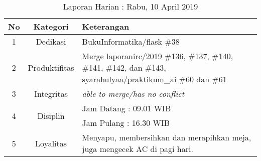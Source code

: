 \begin{table}[htp]
\begin{center}
\caption{Laporan Harian : Rabu, 10 April 2019}
\label{tab:lh100419}
\begin{tabularx}{\textwidth}{|l|l|X|}
\hline
\multicolumn{1}{|c|}{\textbf{No}} & \multicolumn{1}{c|}{\textbf{Kategori}} & \textbf{Keterangan} \\ \hline
\multicolumn{1}{|c|}{\multirow{1}{*}{1}} & \multicolumn{1}{c|}{\multirow{1}{*}{\parbox{2.5cm}{Dedikasi}}}
& BukuInformatika/flask \#38\\
\hline
\multicolumn{1}{|c|}{\multirow{1}{*}{2}} & \multicolumn{1}{c|}{\multirow{1}{*}{\parbox{2.5cm}{Produktifitas}}}
& Merge laporanirc/2019 \#136, \#137, \#140, \#141, \#142, dan \#143, syarahulyaa/praktikum\_ai \#60 dan \#61\\
\hline
\multicolumn{1}{|c|}{\multirow{1}{*}{3}} & \multicolumn{1}{c|}{\multirow{1}{*}{\parbox{2.5cm}{Integritas}}}
& \textit{able to merge/has no conflict} \\
\hline
\multicolumn{1}{|c|}{\multirow{2}{*}{4}} & \multicolumn{1}{c|}{\multirow{2}{*}{\parbox{2.5cm}{Disiplin}}}
& Jam Datang : 09.01 WIB \\
\multicolumn{1}{|c|}{\multirow{1}{*}{}} & \multicolumn{1}{c|}{\multirow{1}{*}{\parbox{2.5cm}{}}}
& Jam Pulang : 16.30 WIB \\
\hline
\multicolumn{1}{|c|}{\multirow{2}{*}{5}} & \multicolumn{1}{c|}{\multirow{2}{*}{\parbox{2.5cm}{Loyalitas}}}
& Menyapu, membersihkan dan merapihkan meja, juga mengecek AC di pagi hari.\\
\hline
\end{tabularx}
\end{center}
\end{table}

